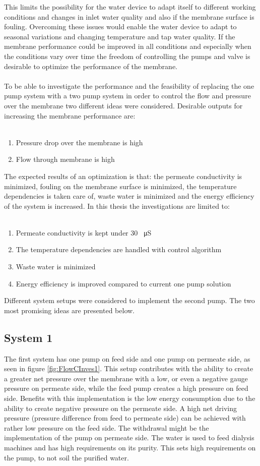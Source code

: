 This limits the possibility for the water device to adapt itself to different working conditions and changes in inlet water quality and also if the membrane surface is fouling. Overcoming these issues would enable the water device to adapt to seasonal variations and changing temperature and tap water quality. If the membrane performance could be improved in all conditions and especially when the conditions vary over time the freedom of controlling the pumps and valve is desirable to optimize the performance of the membrane. \\
\\
To be able to investigate the performance and the feasibility of replacing the one pump system with a two pump system in order to control the flow and pressure over the membrane two different ideas were considered. Desirable outputs for increasing the membrane performance are:\\
\\
\begin{enumerate}
\item Pressure drop over the membrane is high
\item Flow through membrane is high
\end{enumerate}
The expected results of an optimization is that: the permeate conductivity is minimized, fouling on the membrane surface is minimized, the temperature dependencies is taken care of, waste water is minimized and the energy efficiency of the system is increased. In this thesis the investigations are limited to:\\
\\
\begin{enumerate}
\item Permeate conductivity is kept under 30 \SI{}{\micro\siemens}
\item The temperature dependencies are handled with control algorithm
\item Waste water is minimized
\item Energy efficiency is improved compared to current one pump solution
\end{enumerate}
Different system setups were considered to implement the second pump. The two most promising ideas are presented below.

\subsection{System 1}
The first system has one pump on feed side and one pump on permeate side, as seen in figure \ref{fig:FlowCInves1}. This setup contributes with the ability to create a greater net pressure over the membrane with a low, or even a negative gauge pressure on permeate side, while the feed pump creates a high pressure on feed side. Benefits with this implementation is the low energy consumption due to the ability to create negative pressure on the permeate side. A high net driving pressure (pressure difference from feed to permeate side) can be achieved with rather low pressure on the feed side. The withdrawal might be the implementation of the pump on permeate side. The water is used to feed dialysis machines and has high requirements on its purity. This sets high requirements on the pump, to not soil the purified water. 

